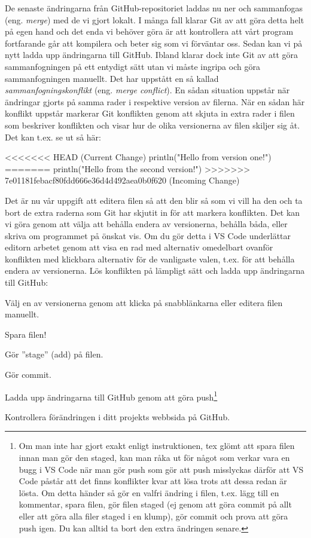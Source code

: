 \begin{Datorarbete}
	De senaste ändringarna från GitHub-repositoriet laddas nu ner och sammanfogas (eng. \emph{merge}) med de vi gjort lokalt. I många fall klarar Git av att göra detta helt på egen hand och det enda vi behöver göra är att kontrollera att vårt program fortfarande går att kompilera och beter sig som vi förväntar oss. Sedan kan vi på nytt ladda upp ändringarna till GitHub. Ibland  klarar dock inte Git av att göra sammanfogningen på ett entydigt sätt utan vi måste ingripa och göra sammanfogningen manuellt. Det har uppstått en så kallad \emph{sammanfogningskonflikt} (eng. \emph{merge conflict}). En sådan situation uppstår när ändringar gjorts på samma rader i respektive version av filerna. När en sådan här konflikt uppstår markerar Git konflikten genom att skjuta in extra rader i filen som beskriver konflikten och visar hur de olika versionerna av filen skiljer sig åt. Det kan t.ex. se ut så här:

	\begin{Code}
		<<<<<<< HEAD (Current Change)
		println("Hello from version one!")
		=======
		println("Hello from the second version!")
		>>>>>>> 7e01181febacf80fdd666e36d4d492aea0b0f620 (Incoming Change)
	\end{Code}

	Det är nu vår uppgift att editera filen så att den blir så som vi vill ha den och ta bort de extra raderna som Git har skjutit in för att markera konflikten. Det kan vi göra genom att välja att behålla endera av versionerna, behålla båda, eller skriva om programmet på önskat vis. Om du gör detta i VS Code underlättar editorn arbetet genom att visa en rad med alternativ omedelbart ovanför konflikten med klickbara alternativ för de vanligaste valen, t.ex. för att behålla endera av versionerna. Lös konflikten på lämpligt sätt och ladda upp ändringarna till GitHub:

	\begin{Deluppgifter}
		\item Välj en av versionerna genom att klicka på snabblänkarna eller editera filen manuellt.
		\item Spara filen!
		\item Gör ''stage'' (add) på filen.
		\item Gör commit.
		\item Ladda upp ändringarna till GitHub genom att göra push\footnote{Om man inte har gjort exakt enligt instruktionen, tex glömt att spara filen innan man gör den staged, kan man råka ut för något som verkar vara en bugg i VS Code när man gör push som gör att push misslyckas därför att VS Code påstår att det finns konflikter kvar att lösa trots att dessa redan är lösta. Om detta händer så gör en valfri ändring i filen, t.ex. lägg till en kommentar, spara filen, gör filen staged (ej genom att göra commit på allt eller att göra alla filer staged i en klump), gör commit och prova att göra push igen. Du kan alltid ta bort den extra ändringen senare.}
		\item Kontrollera förändringen i ditt projekts webbsida på GitHub.
	\end{Deluppgifter}


\end{Datorarbete}
